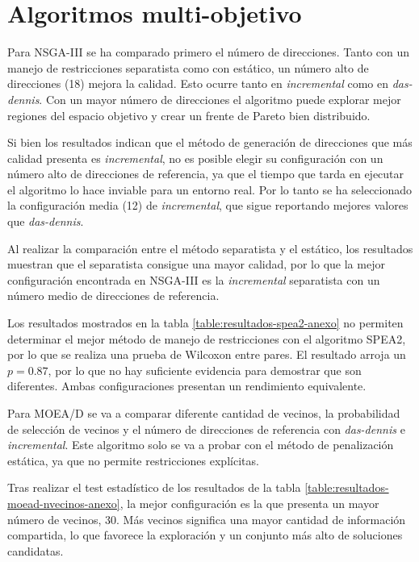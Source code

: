 \renewcommand{\arraystretch}{1}
\newpage
\section{Algoritmos multi-objetivo}
\label{ch:algoritmos-multiobjetivo}

Para NSGA-III se ha comparado primero el número de direcciones. Tanto con un manejo de restricciones separatista como con estático, un número alto de direcciones (18) mejora la calidad. Esto ocurre tanto en \textit{incremental} como en \textit{das-dennis}. Con un mayor número de direcciones el algoritmo puede explorar mejor regiones del espacio objetivo y crear un frente de Pareto bien distribuido.

Si bien los resultados indican que el método de generación de direcciones que más calidad presenta es \textit{incremental}, no es posible elegir su configuración con un número alto de direcciones de referencia, ya que el tiempo que tarda en ejecutar el algoritmo lo hace inviable para un entorno real. Por lo tanto se ha seleccionado la configuración media (12) de \textit{incremental}, que sigue reportando mejores valores que \textit{das-dennis}.

Al realizar la comparación entre el método separatista y el estático, los resultados muestran que el separatista consigue una mayor calidad, por lo que la mejor configuración encontrada en NSGA-III es la \textit{incremental} separatista con un número medio de direcciones de referencia.

Los resultados mostrados en la tabla \ref{table:resultados-spea2-anexo} no permiten determinar el mejor método de manejo de restricciones con el algoritmo SPEA2, por lo que se realiza una prueba de Wilcoxon entre pares. El resultado arroja un \textit{$p = 0.87$}, por lo que no hay suficiente evidencia para demostrar que son diferentes. Ambas configuraciones presentan un rendimiento equivalente.

Para MOEA/D se va a comparar diferente cantidad de vecinos, la probabilidad de selección de vecinos y el número de direcciones de referencia con \textit{das-dennis} e \textit{incremental}. Este algoritmo solo se va a probar con el método de penalización estática, ya que no permite restricciones explícitas.

Tras realizar el test estadístico de los resultados de la tabla \ref{table:resultados-moead-nvecinos-anexo}, la mejor configuración es la que presenta un mayor número de vecinos, 30. Más vecinos significa una mayor cantidad de información compartida, lo que favorece la exploración y un conjunto más alto de soluciones candidatas.

